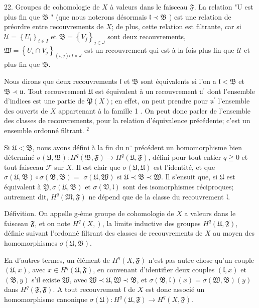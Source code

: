 22. Groupes de cohomologie de $X$ à valeurs dans le faisceau $\mathfrak{F}$. La relation "U est plus fin que $\mathfrak{B}$ " (que nous noterons désormais $\mathfrak{l} \prec \mathfrak{B}$ ) est une relation de préordre entre recouvrements de $X$; de plus, cette relation est filtrante, car si $\mathcal{U}=\left\{U_{i}\right\}_{i \in I}$ et $\mathfrak{B}=\left\{V_{j}\right\}_{j \in J}$ sont deux recouvrements, $\mathfrak{W}=\left\{U_{i} \cap V_{j}\right\}_{(i, j) \epsilon I \times J}$ est un recouvrement qui est à la fois plus fin que $\mathcal{U}$ et plus fin que $\mathfrak{B}$.

Nous dirons que deux recouvrements $\mathfrak{l}$ et $\mathfrak{B}$ sont équivalents si l'on a $\mathfrak{l}<\mathfrak{B}$ et $\mathfrak{B} \prec \mathfrak{u} .$ Tout recouvrement $\mathfrak{U}$ est équivalent à un recouvrement $\mathfrak{u}^{\prime}$ dont l'ensemble d'indices est une partie de $\mathfrak{P}(X)$; en effet, on peut prendre pour $\mathfrak{u}^{\prime}$ l'ensemble des ouverts de $X$ appartenant à la famille 1 . On peut donc parler de l'ensemble des classes de recouvrements, pour la relation d'équivalence précédente; c'est un ensemble ordonné filtrant. $^{2}$

Si $\mathfrak{U}<\mathfrak{B}$, nous avons défini à la fin du $\mathrm{n}^{\circ}$ précédent un homomorphisme bien déterminé $\sigma(\mathfrak{U}, \mathfrak{B}): H^{q}(\mathfrak{B}, \mathfrak{F}) \rightarrow H^{q}(\mathfrak{U}, \mathfrak{F})$, défini pour tout entier $q \geqq 0$ et tout faisceau $\mathcal{F}$ sur $X$. Il est clair que $\sigma(\mathfrak{U}, \mathfrak{U})$ est l'identité, et que $\sigma(\mathfrak{U}, \mathfrak{B}) \circ \sigma(\mathfrak{B}, \mathfrak{B})=$ $\sigma(\mathfrak{U}, \mathfrak{W})$ si $\mathfrak{U} \prec \mathfrak{B} \prec \mathfrak{W}$. Il s'ensuit que, si $\mathfrak{U}$ est équivalent à $\mathfrak{Y}, \sigma(\mathfrak{U}, \mathfrak{B})$ et $\sigma(\mathfrak{V}, \mathfrak{l})$ sont des isomorphismes réciproques; autrement dit, $H^{q}(\mathfrak{M}, \mathfrak{F})$ ne dépend que de la classe du recouvrement $\mathfrak{l}$.

Défivition. On appelle g-ème groupe de cohomologie de $X$ a valeurs dans le faisceau $\mathfrak{F}$, et on note $H^{q}(X, \mathfrak{})$, la limite inductive des groupes $H^{q}(\mathfrak{U}, \mathfrak{F})$, définie suivant l'ordonné filtrant des classes de recouvrements de $X$ au moyen des homomorphismes $\sigma(\mathfrak{U}, \mathfrak{B})$.

En d'autres termes, un élément de $H^{q}(X, \mathfrak{F})$ n'est pas autre chose qu'un couple $(\mathfrak{U}, x)$, avec $x \in H^{q}(\mathfrak{U}, \mathfrak{F})$, en convenant d'identifier deux couples $(\mathfrak{l}, x)$ et $(\mathfrak{B}, y)$ s'il existe $\mathfrak{W}$, avec $\mathfrak{W} \prec \mathfrak{U}, \mathfrak{W} \prec \mathfrak{B}$, et $\sigma(\mathfrak{B}, \mathfrak{l})(x)=\sigma(\mathfrak{W}, \mathfrak{B})(y)$ dans $H^{q}(\mathfrak{F}, \mathfrak{F})$. A tout recouvrement $\mathfrak{l}$ de $X$ est donc associé un homomorphisme canonique $\sigma(\mathfrak{U}): H^{q}(\mathfrak{U}, \mathfrak{F}) \rightarrow H^{q}(X, \mathfrak{F})$.

